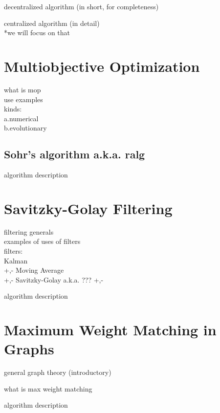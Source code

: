 decentralized algorithm (in short, for completeness)

centralized algorithm (in detail)\\
*we will focus on that


\section{Multiobjective Optimization} \label{sec:theorBack-MOP}

what is mop\\
use examples\\
kinds:\\
	a.numerical\\
	b.evolutionary

\subsection{Sohr's algorithm a.k.a. ralg} \label{subsec:theorBack-MOP-minimax}

algorithm description

\section{Savitzky-Golay Filtering} \label{sec:theorBack-SavitzkyGolay}

filtering generals\\
examples of uses of filters\\
filters:\\
	Kalman\\
		+,-
	Moving Average\\
		+,-
	Savitzky-Golay a.k.a. ???
		+,-

algorithm description

\section{Maximum Weight Matching in Graphs} \label{sec:theorBack-MWMGraphs}

general graph theory (introductory)

what is max weight matching

algorithm description

